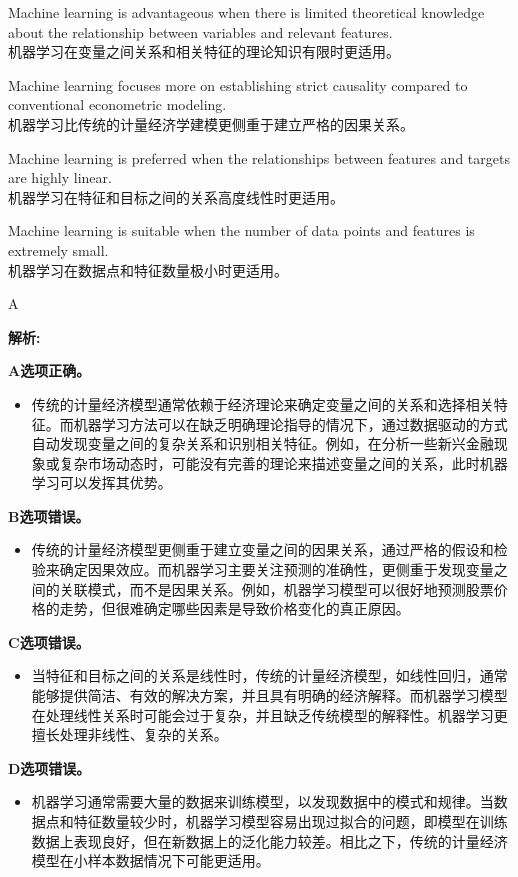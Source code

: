 \documentclass{article}
\newenvironment{explanation}
{\textbf{解析:}\par}
{\par}
\begin{document}
    \begin{choices}
        \item Machine learning is advantageous when there is limited theoretical knowledge about the relationship between variables and relevant features.\\
        机器学习在变量之间关系和相关特征的理论知识有限时更适用。
        \item Machine learning focuses more on establishing strict causality compared to conventional econometric modeling.\\
        机器学习比传统的计量经济学建模更侧重于建立严格的因果关系。
        \item Machine learning is preferred when the relationships between features and targets are highly linear.\\
        机器学习在特征和目标之间的关系高度线性时更适用。
        \item Machine learning is suitable when the number of data points and features is extremely small.\\
        机器学习在数据点和特征数量极小时更适用。
    \end{choices}
    
    \begin{correctanswer}
        A
    \end{correctanswer}
    
    \begin{explanation}
    \textbf{A选项正确。}
    \begin{itemize}
        \item 传统的计量经济模型通常依赖于经济理论来确定变量之间的关系和选择相关特征。而机器学习方法可以在缺乏明确理论指导的情况下，通过数据驱动的方式自动发现变量之间的复杂关系和识别相关特征。例如，在分析一些新兴金融现象或复杂市场动态时，可能没有完善的理论来描述变量之间的关系，此时机器学习可以发挥其优势。
    \end{itemize}
    \textbf{B选项错误。}
    \begin{itemize}
        \item 传统的计量经济模型更侧重于建立变量之间的因果关系，通过严格的假设和检验来确定因果效应。而机器学习主要关注预测的准确性，更侧重于发现变量之间的关联模式，而不是因果关系。例如，机器学习模型可以很好地预测股票价格的走势，但很难确定哪些因素是导致价格变化的真正原因。
    \end{itemize}
    \textbf{C选项错误。}
    \begin{itemize}
        \item 当特征和目标之间的关系是线性时，传统的计量经济模型，如线性回归，通常能够提供简洁、有效的解决方案，并且具有明确的经济解释。而机器学习模型在处理线性关系时可能会过于复杂，并且缺乏传统模型的解释性。机器学习更擅长处理非线性、复杂的关系。
    \end{itemize}
    \textbf{D选项错误。}
    \begin{itemize}
        \item 机器学习通常需要大量的数据来训练模型，以发现数据中的模式和规律。当数据点和特征数量较少时，机器学习模型容易出现过拟合的问题，即模型在训练数据上表现良好，但在新数据上的泛化能力较差。相比之下，传统的计量经济模型在小样本数据情况下可能更适用。
    \end{itemize}
    \end{explanation}
    
\end{document}
